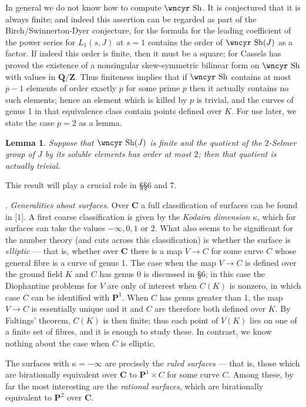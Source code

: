 \documentclass[12pt]{article}
\def\bC{{\mathbf C}}
\def\bP{{\mathbf P}}
\def\bQ{{\mathbf Q}}
\def\bZ{{\mathbf Z}}
\def\gk{{\kappa}}
\def\Sha{\mbox{\wncyr Sh}}
\def\ble{\begin{lemma} \label}
\def\ele{\end{lemma}}
\newtheorem{lemma}{Lemma}
\begin{document}
In general we do not know how to compute $\Sha$. It is
conjectured that it is always finite; and indeed this assertion can be
regarded as part of the Birch/Swinnerton-Dyer conjecture, for the formula
for the leading coefficient of the power series for $L_1(s,J)$
at $s=1$ contains the
order of $\Sha(J)$ as a factor. If indeed this order is finite,
then it must be a square; for Cassels has proved the existence of a
nonsingular skew-symmetric bilinear form on $\Sha$
with values in $\bQ/\bZ$. Thus
finiteness implies that if $\Sha$ contains at most $p-1$ elements of order
exactly $p$ for some prime $p$ then it actually contains no
such elements; hence an element which is killed by $p$ is trivial,
and the curves of genus 1 in that equivalence class
contain points defined over $K$. For use later, we state the case $p=2$ as a
lemma.
\ble{L4} Suppose that $\Sha(J)$ is finite and the
quotient of the $2$-Selmer group of $J$ by its soluble elements has order at
most $2$; then that quotient is actually trivial.
\ele
This result will play a crucial role in \S\S 6 and 7.


\bigskip

. \emph{Generalities about surfaces}. \newline
Over $\bC$ a full classification of surfaces can be found in [1]. A first
coarse classification is given by the \emph{Kodaira dimension} $\gk$, which
for surfaces can take the values $-\infty,0,1$ or 2. What also seems to be
significant for the number theory (and cuts across this classification)
is whether the surface is \emph{elliptic} --- that is, whether over $\bC$
there is a map $V\rightarrow C$ for some curve $C$ whose general fibre
is a curve of genus 1. The case when the map $V\rightarrow C$ is defined over
the ground field $K$ and $C$ has genus 0 is discussed in \S6; in this case the
Diophantine problems for $V$ are only of interest when $C(K)$ is nonzero,
in which case $C$ can be identified with
$\bP^1$. When $C$ has genus greater than
1, the map $V\rightarrow C$ is essentially unique and it and $C$ are therefore
both defined over $K$. By Faltings' theorem, $C(K)$ is then finite;
thus each point of $V(K)$ lies on one of a finite set of fibres, and it is
enough to study these. In contrast,
we know nothing about the case when $C$ is elliptic.

The surfaces with $\gk=-\infty$ are precisely the \emph{ruled surfaces} ---
that is, those which are birationally equivalent over $\bC$ to $\bP^1\times C$
for some curve $C$. Among these, by far the most interesting are the
\emph{rational surfaces}, which are birationally equivalent to $\bP^2$ over
$\bC$.
\end{document}
